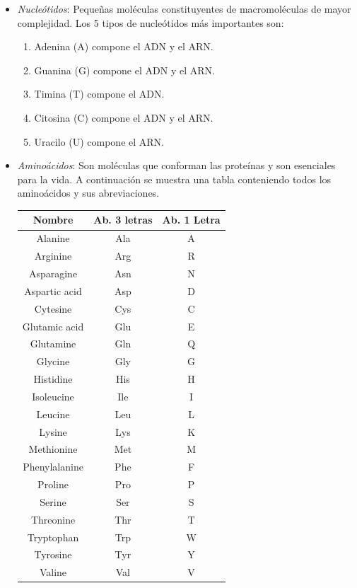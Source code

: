   \begin{itemize}
    \item \emph{Nucle\'otidos}:
      Peque\~nas mol\'eculas constituyentes de macromol\'eculas de mayor complejidad. Los 5 tipos de nucle\'otidos m\'as importantes son:
      \begin{enumerate}
        \item Adenina (A) compone el ADN y el ARN.
        \item Guanina (G) compone el ADN y el ARN.
        \item Timina (T) compone el ADN.
        \item Citosina (C) compone el ADN y el ARN.
        \item Uracilo (U) compone el ARN.
      \end{enumerate}


    \item \emph{Amino\'acidos}:
      Son mol\'eculas que conforman las prote\'inas y son esenciales para la vida. A continuaci\'on se muestra una tabla conteniendo todos los amino\'acidos 
      y sus abreviaciones.
      \begin{center}
        \begin{tabular}{|ccc|}
          \hline Nombre & Ab. 3 letras & Ab. 1 Letra \\ 
          \hline Alanine & Ala & A \\ 
          \hline Arginine & Arg & R \\ 
          \hline Asparagine & Asn & N \\ 
          \hline Aspartic acid & Asp & D \\ 
          \hline Cytesine & Cys & C \\ 
          \hline Glutamic acid & Glu & E \\ 
          \hline Glutamine & Gln & Q \\ 
          \hline Glycine & Gly & G \\ 
          \hline Histidine & His & H \\ 
          \hline Isoleucine & Ile & I \\ 	
          \hline Leucine & Leu & L \\ 
          \hline Lysine & Lys & K \\ 
          \hline Methionine & Met & M \\ 
          \hline Phenylalanine & Phe & F \\ 
          \hline Proline & Pro & P \\ 
          \hline Serine & Ser & S \\ 
          \hline Threonine & Thr & T \\ 
          \hline Tryptophan & Trp & W \\ 
          \hline Tyrosine & Tyr & Y \\ 
          \hline Valine & Val & V \\ 
          \hline 
        \end{tabular} 
      \end{center}
  \end{itemize}


